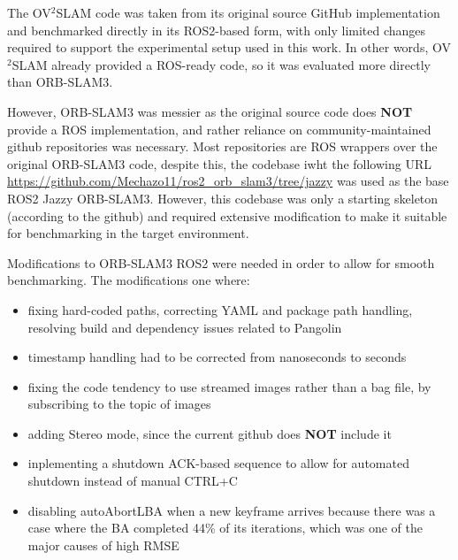 \documentclass[11pt]{article}
\begin{document}
The OV$^{2}$SLAM code was taken from its original source GitHub implementation and benchmarked directly in its ROS2-based form, with only limited changes required to support the experimental setup used in this work. In other words, OV$^{2}$SLAM already provided a ROS-ready code, so it was evaluated more directly than ORB-SLAM3.

However, ORB-SLAM3 was messier as the original source code does \textbf{NOT} provide a ROS implementation, and rather reliance on community-maintained github repositories was necessary. Most repositories are ROS wrappers over the original ORB-SLAM3 code, despite this, the codebase iwht the following URL \url{https://github.com/Mechazo11/ros2_orb_slam3/tree/jazzy} was used as the base ROS2 Jazzy ORB-SLAM3. However, this codebase was only a starting skeleton (according to the github) and required extensive modification to make it suitable for benchmarking in the target environment.

Modifications to ORB-SLAM3 ROS2 were needed in order to allow for smooth benchmarking.
The modifications one where:
\begin{itemize}
    \item fixing hard-coded paths, correcting YAML and package path handling, resolving build and dependency issues related to Pangolin
    \item  timestamp handling had to be corrected from nanoseconds to seconds
    \item fixing the code tendency to use streamed images rather than a bag file, by subscribing to the topic of images
    \item adding Stereo mode, since the current github does \textbf{NOT} include it
    \item inplementing a shutdown ACK-based sequence to allow for automated shutdown instead of manual CTRL+C
    \item disabling autoAbortLBA when a new keyframe arrives because there was a case where the BA completed 44\% of its iterations, which was one of the major causes of high RMSE
\end{itemize}
\end{document}
